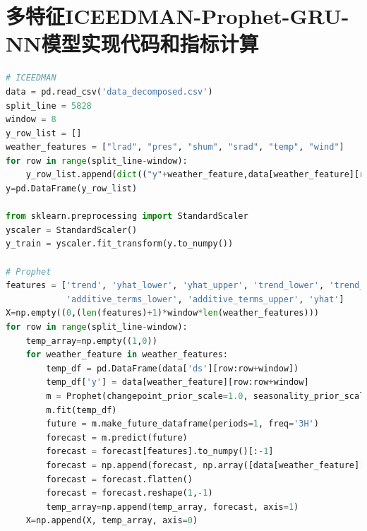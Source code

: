 \documentclass[AutoFakeBold]{LZUThesis}
\begin{document}
\section{多特征ICEEDMAN-Prophet-GRU-NN模型实现代码和指标计算}

\begin{lstlisting}[language = python]
# ICEEDMAN
data = pd.read_csv('data_decomposed.csv')
split_line = 5828
window = 8
y_row_list = []
weather_features = ["lrad", "pres", "shum", "srad", "temp", "wind"]
for row in range(split_line-window):
    y_row_list.append(dict(("y"+weather_feature,data[weather_feature][row+window]) for weather_feature in weather_features))
y=pd.DataFrame(y_row_list)

from sklearn.preprocessing import StandardScaler
yscaler = StandardScaler()
y_train = yscaler.fit_transform(y.to_numpy())

# Prophet
features = ['trend', 'yhat_lower', 'yhat_upper', 'trend_lower', 'trend_upper', 'additive_terms',
            'additive_terms_lower', 'additive_terms_upper', 'yhat']
X=np.empty((0,(len(features)+1)*window*len(weather_features)))
for row in range(split_line-window):
    temp_array=np.empty((1,0))
    for weather_feature in weather_features:
        temp_df = pd.DataFrame(data['ds'][row:row+window])
        temp_df['y'] = data[weather_feature][row:row+window]
        m = Prophet(changepoint_prior_scale=1.0, seasonality_prior_scale=0.1, seasonality_mode='additive', changepoint_range=1)
        m.fit(temp_df)
        future = m.make_future_dataframe(periods=1, freq='3H')
        forecast = m.predict(future)
        forecast = forecast[features].to_numpy()[:-1]
        forecast = np.append(forecast, np.array([data[weather_feature][row+i] for i in range(window)]).reshape(-1,1), axis=1)
        forecast = forecast.flatten()
        forecast = forecast.reshape(1,-1)
        temp_array=np.append(temp_array, forecast, axis=1)
    X=np.append(X, temp_array, axis=0)


\end{lstlisting}
\end{document}
